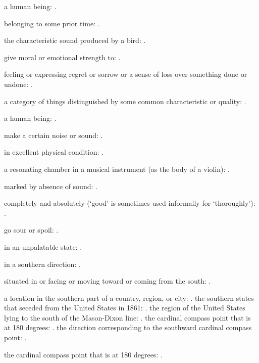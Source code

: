   a human being: .

  belonging to some prior time: .

  the characteristic sound produced by a bird: .

  give moral or emotional strength to: .

  feeling or expressing regret or sorrow or a sense of loss over something done or undone: .

  a category of things distinguished by some common characteristic or quality: .

  a human being: .

  make a certain noise or sound: .

  in excellent physical condition: .

  a resonating chamber in a musical instrument (as the body of a violin): .

  marked by absence of sound: .

  completely and absolutely (`good' is sometimes used informally for `thoroughly'): .

  go sour or spoil: .

  in an unpalatable state: .

  in a southern direction: .

  situated in or facing or moving toward or coming from the south: .

  a location in the southern part of a country, region, or city: . the southern states that seceded from the United States in 1861: . the region of the United States lying to the south of the Mason-Dixon line: . the cardinal compass point that is at 180 degrees: . the direction corresponding to the southward cardinal compass point: .

  the cardinal compass point that is at 180 degrees: .

